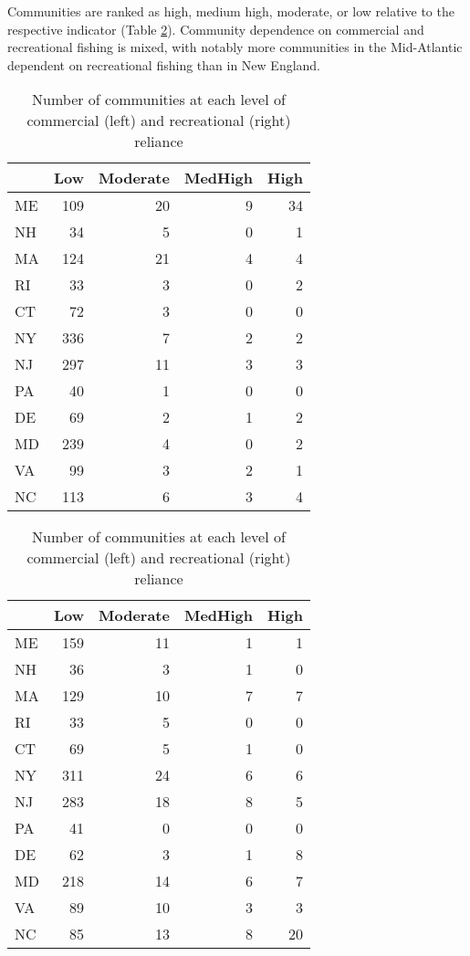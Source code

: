 \documentclass[11pt,]{article}
\begin{document}
Communities are ranked as high, medium high, moderate, or low relative
to the respective indicator (Table \ref{reliance}). Community dependence
on commercial and recreational fishing is mixed, with notably more
communities in the Mid-Atlantic dependent on recreational fishing than
in New England.

\begin{table}[h] \centering  
\begin{tabular}{lrrrr}
\toprule
  & Low & Moderate & MedHigh & High\\
\midrule
ME & 109 & 20 & 9 & 34\\
NH & 34 & 5 & 0 & 1\\
MA & 124 & 21 & 4 & 4\\
RI & 33 & 3 & 0 & 2\\
CT & 72 & 3 & 0 & 0\\
\addlinespace
NY & 336 & 7 & 2 & 2\\
NJ & 297 & 11 & 3 & 3\\
PA & 40 & 1 & 0 & 0\\
DE & 69 & 2 & 1 & 2\\
MD & 239 & 4 & 0 & 2\\
\addlinespace
VA & 99 & 3 & 2 & 1\\
NC & 113 & 6 & 3 & 4\\
\bottomrule
\end{tabular} \hspace{1cm} \centering  
\begin{tabular}{lrrrr}
\toprule
  & Low & Moderate & MedHigh & High\\
\midrule
ME & 159 & 11 & 1 & 1\\
NH & 36 & 3 & 1 & 0\\
MA & 129 & 10 & 7 & 7\\
RI & 33 & 5 & 0 & 0\\
CT & 69 & 5 & 1 & 0\\
\addlinespace
NY & 311 & 24 & 6 & 6\\
NJ & 283 & 18 & 8 & 5\\
PA & 41 & 0 & 0 & 0\\
DE & 62 & 3 & 1 & 8\\
MD & 218 & 14 & 6 & 7\\
\addlinespace
VA & 89 & 10 & 3 & 3\\
NC & 85 & 13 & 8 & 20\\
\bottomrule
\end{tabular} \caption{Number of communities at each level of commercial (left) and recreational (right) reliance\label{reliance}} \end{table}
\end{document}
